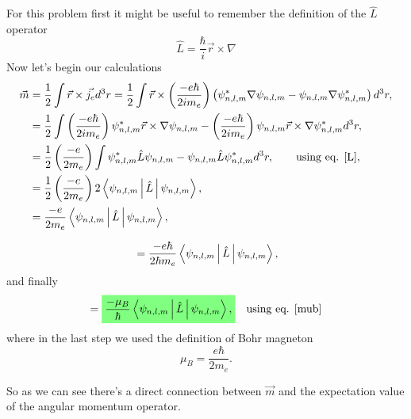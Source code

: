 \begin{questions}
\begin{solution}
For this problem first it might be useful to remember the definition of the $\hat{L}$ operator
\begin{equation}
  \hat{L} = \frac{\hbar}{i}\vec{r}\times\nabla
  \label{L}
\end{equation}
Now let's begin our calculations
\begin{eqnarray}
  \begin{aligned}
  \vec{m} &= \frac{1}{2}\int \vec{r}\times \vec{j_e} d^3r = \frac{1}{2}\int \vec{r}\times \left(\frac{-e\hbar}{2im_e}\right)\left(\psi_{n,l,m}^*\nabla \psi_{n,l,m} - \psi_{n,l,m} \nabla \psi_{n,l,m}^*\right)d^3r,\nonumber\\
  &= \frac{1}{2}\int  \left(\frac{-e\hbar}{2im_e}\right)\psi_{n,l,m}^* \vec{r}\times\nabla \psi_{n,l,m} - \left(\frac{-e\hbar}{2im_e}\right)\psi_{n,l,m} \vec{r}\times\nabla \psi_{n,l,m}^*d^3r, \nonumber \\
  &= \frac{1}{2}\left(\frac{-e}{2m_e}\right)\int  \psi_{n,l,m}^* \hat{L} \psi_{n,l,m} - \psi_{n,l,m} \hat{L} \psi_{n,l,m}^*d^3r, \qquad \text{using eq. \ref{L}},\nonumber\\
  &= \frac{1}{2}\left(\frac{-e}{2m_e}\right)2\Braket{ \psi_{n,l,m}| \hat{L} |\psi_{n,l,m} } ,\nonumber\\
  &= \frac{-e}{2m_e}\Braket{ \psi_{n,l,m}| \hat{L} |\psi_{n,l,m} } ,\nonumber\\
 \end{aligned}
\end{eqnarray}

\begin{eqnarray}
  \begin{aligned}
    &= \frac{-e\hbar}{2\hbar m_e}\Braket{ \psi_{n,l,m}| \hat{L} |\psi_{n,l,m} } ,\nonumber \\
 \end{aligned}
\end{eqnarray}
and finally
\begin{equation}
  = \hlgreen{ \frac{-\mu_B}{\hbar}\Braket{ \psi_{n,l,m}| \hat{L} |\psi_{n,l,m} } , }\quad \text{using eq. \ref{mub}}
  \label{exp:mu}
\end{equation}
where in the last step we used the definition of Bohr magneton
\begin{equation}
  \mu_B = \frac{e\hbar}{2m_e}.
  \label{mub}
\end{equation}

So as we can see there's a direct connection between $\vec{m}$ and the expectation value of the angular momentum operator.


\end{solution}
\end{questions}
